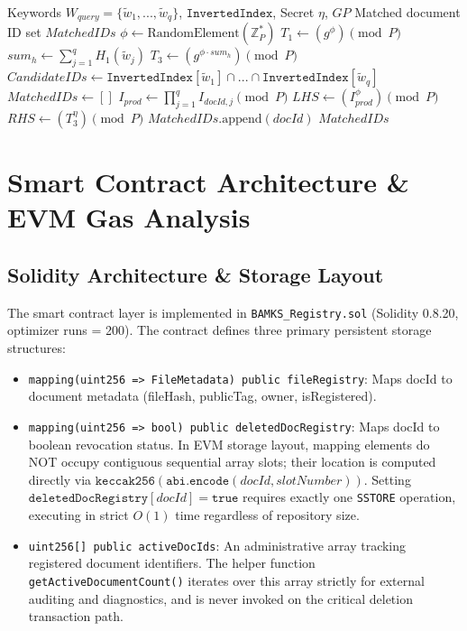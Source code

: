 \documentclass[journal,10pt,twocolumn]{IEEEtran}
\begin{document}
\begin{algorithm}[t]
\caption{Conjunctive Trapdoor Generation \& Matching}
\label{algo:search}
\begin{algorithmic}[1]
\REQUIRE Keywords $W_{query} = \{\tilde{w}_1, ..., \tilde{w}_q\}$, $\texttt{InvertedIndex}$, Secret $\eta$, $GP$
\ENSURE Matched document ID set $MatchedIDs$
\STATE $\phi \leftarrow \text{RandomElement}(\mathbb{Z}_P^*)$
\STATE $T_1 \leftarrow (g^\phi) \pmod P$
\STATE $sum_h \leftarrow \sum_{j=1}^q H_1(\tilde{w}_j)$
\STATE $T_3 \leftarrow (g^{\phi \cdot sum_h}) \pmod P$
\STATE $CandidateIDs \leftarrow \texttt{InvertedIndex}[\tilde{w}_1] \cap ... \cap \texttt{InvertedIndex}[\tilde{w}_q]$
\STATE $MatchedIDs \leftarrow []$
    \STATE $I_{prod} \leftarrow \prod_{j=1}^q I_{docId,j} \pmod P$
    \STATE $LHS \leftarrow (I_{prod}^\phi) \pmod P$
    \STATE $RHS \leftarrow (T_3^\eta) \pmod P$
        \STATE $MatchedIDs.\text{append}(docId)$
    \ENDIF
\ENDFOR
\RETURN $MatchedIDs$
\end{algorithmic}
\end{algorithm}

\section{Smart Contract Architecture \& EVM Gas Analysis}

\subsection{Solidity Architecture \& Storage Layout}
The smart contract layer is implemented in \texttt{BAMKS\_Registry.sol} (Solidity 0.8.20, optimizer runs = 200). The contract defines three primary persistent storage structures:
\begin{itemize}
    \item \texttt{mapping(uint256 => FileMetadata) public fileRegistry}: Maps docId to document metadata (fileHash, publicTag, owner, isRegistered).
    \item \texttt{mapping(uint256 => bool) public deletedDocRegistry}: Maps docId to boolean revocation status. In EVM storage layout, mapping elements do NOT occupy contiguous sequential array slots; their location is computed directly via $\texttt{keccak256}(\texttt{abi.encode}(docId, slotNumber))$. Setting $\texttt{deletedDocRegistry}[docId] = \texttt{true}$ requires exactly one \texttt{SSTORE} operation, executing in strict $O(1)$ time regardless of repository size.
    \item \texttt{uint256[] public activeDocIds}: An administrative array tracking registered document identifiers. The helper function \texttt{getActiveDocumentCount()} iterates over this array strictly for external auditing and diagnostics, and is never invoked on the critical deletion transaction path.
\end{itemize}
\end{document}
